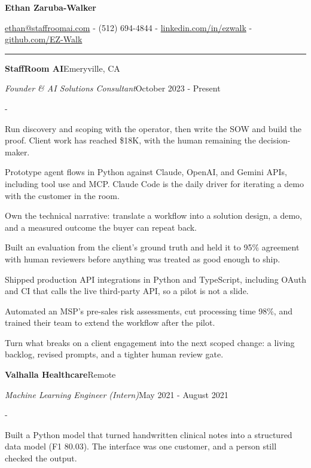\documentclass[10pt,letterpaper]{article}
\newenvironment{cvitems}{%
  \begin{list}{-}{%
    \setlength{\leftmargin}{12pt}%
    \setlength{\itemsep}{1.2pt}%
    \setlength{\parsep}{0pt}%
    \setlength{\topsep}{1.5pt}%
    \setlength{\partopsep}{0pt}%
    \setlength{\labelwidth}{6pt}%
    \setlength{\labelsep}{6pt}%
    \setlength{\itemindent}{0pt}%
  }%
}{\end{list}}
\newcommand{\cvsection}[1]{%
  \vspace{7pt}%
  \noindent{\bfseries\fontsize{11pt}{13pt}\selectfont\MakeUppercase{#1}}\par
  \vspace{1pt}%
  \noindent\rule{\textwidth}{0.4pt}\par
  \vspace{4pt}%
}
\newcommand{\cventryhead}[4]{%
  \noindent\textbf{#1}\hfill#2\par
  \vspace{0.5pt}%
  \noindent\textit{#3}\hfill#4\par
}
\begin{document}
\begin{center}
  {\bfseries\fontsize{22pt}{24pt}\selectfont Ethan Zaruba-Walker\par}
  \vspace{4pt}
  {\fontsize{10pt}{12pt}\selectfont
    \href{mailto:ethan@staffroomai.com}{ethan@staffroomai.com}
    {-}
    (512) 694-4844
    {-}
    \href{https://linkedin.com/in/ezwalk}{linkedin.com/in/ezwalk}
    {-}
    \href{https://github.com/EZ-Walk}{github.com/EZ-Walk}\par}
\end{center}
\vspace{2pt}

\cvsection{Experience}

\cventryhead{StaffRoom AI}{Emeryville, CA}
{Founder \& AI Solutions Consultant}{October 2023 - Present}
\begin{cvitems}
  \item Run discovery and scoping with the operator, then write the SOW and build the proof. Client work has reached \$18K, with the human remaining the decision-maker.
  \item Prototype agent flows in Python against Claude, OpenAI, and Gemini APIs, including tool use and MCP. Claude Code is the daily driver for iterating a demo with the customer in the room.
  \item Own the technical narrative: translate a workflow into a solution design, a demo, and a measured outcome the buyer can repeat back.
  \item Built an evaluation from the client's ground truth and held it to 95\% agreement with human reviewers before anything was treated as good enough to ship.
  \item Shipped production API integrations in Python and TypeScript, including OAuth and CI that calls the live third-party API, so a pilot is not a slide.
  \item Automated an MSP's pre-sales risk assessments, cut processing time 98\%, and trained their team to extend the workflow after the pilot.
  \item Turn what breaks on a client engagement into the next scoped change: a living backlog, revised prompts, and a tighter human review gate.
\end{cvitems}

\vspace{3pt}
\cventryhead{Valhalla Healthcare}{Remote}
{Machine Learning Engineer (Intern)}{May 2021 - August 2021}
\begin{cvitems}
  \item Built a Python model that turned handwritten clinical notes into a structured data model (F1 80.03). The interface was one customer, and a person still checked the output.
\end{cvitems}
\end{document}
